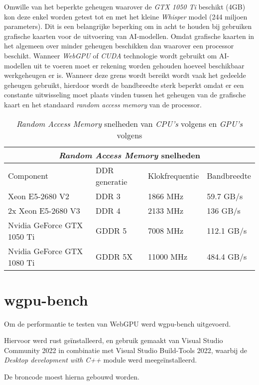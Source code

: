 Omwille van het beperkte geheugen waarover de \textit{GTX 1050 Ti} beschikt (4GB) kon deze enkel worden getest tot en met het kleine \textit{Whisper} model (244 miljoen parameters). Dit is een belangrijke beperking om in acht te houden bij gebruiken grafische kaarten voor de uitvoering van AI-modellen. Omdat grafische kaarten in het algemeen over minder geheugen beschikken dan waarover een processor beschikt. Wanneer \textit{WebGPU} of \textit{CUDA} technologie wordt gebruikt om AI-modellen uit te voeren moet er rekening worden gehouden hoeveel beschikbaar werkgeheugen er is. Wanneer deze grens wordt bereikt wordt vaak het gedeelde geheugen gebruikt, hierdoor wordt de bandbreedte sterk beperkt omdat er een constante uitwisseling moet plaats vinden tussen het geheugen van de grafische kaart en het standaard \textit{random access memory} van de processor.

\bigbreak{}

\begin{table}
    \begin{tabular}{ |p{6cm}|p{3cm}|p{3cm}|p{3cm}|  }
        \hline
        \multicolumn{4}{|c|}{\textit{Random Access Memory} snelheden} \\
        \hline
        Component& DDR generatie & Klokfrequentie & Bandbreedte \\
        \hline
            Xeon E5-2680 V2             & DDR 3     & 1866 MHz  & 59.7 GB/s \\
            2x Xeon E5-2680 V3          & DDR 4     & 2133 MHz  & 136 GB/s  \\
            Nvidia GeForce GTX 1050 Ti  & GDDR 5    & 7008 MHz  & 112.1 GB/s\\
            Nvidia GeForce GTX 1080 Ti  & GDDR 5X   & 11000 MHz & 484.4 GB/s\\
        \hline
    \end{tabular}
    \caption[Verschillen in RAM snelheden voor \textit{CPU's} en \textit{GPU's}~\autocite{Intel2013,Intel2014,TechPowerUp2016, TechPowerUp2017}]{\textit{Random Access Memory} snelheden van \textit{CPU's} volgens \textcite{Intel2013,Intel2014} en \textit{GPU's} volgens \textcite{TechPowerUp2016, TechPowerUp2017}}
\end{table}

\section{wgpu-bench}

Om de performantie te testen van WebGPU werd wgpu-bench uitgevoerd.

Hiervoor werd rust geïnstalleerd, en gebruik gemaakt van Visual Studio Community 2022 in combinatie met Visual Studio Build-Tools 2022, waarbij de \textit{Desktop development with C++} module werd meegeïnstalleerd.

De broncode moest hierna gebouwd worden.


\break{}
